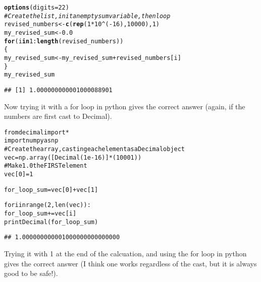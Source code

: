\documentclass{article}\usepackage[]{graphicx}\usepackage[]{color}
\makeatletter
\newcommand{\hlnum}[1]{\textcolor[rgb]{0.686,0.059,0.569}{#1}}%
\newcommand{\hlcom}[1]{\textcolor[rgb]{0.678,0.584,0.686}{\textit{#1}}}%
\newcommand{\hlopt}[1]{\textcolor[rgb]{0,0,0}{#1}}%
\newcommand{\hlstd}[1]{\textcolor[rgb]{0.345,0.345,0.345}{#1}}%
\newcommand{\hlkwa}[1]{\textcolor[rgb]{0.161,0.373,0.58}{\textbf{#1}}}%
\newcommand{\hlkwb}[1]{\textcolor[rgb]{0.69,0.353,0.396}{#1}}%
\newcommand{\hlkwc}[1]{\textcolor[rgb]{0.333,0.667,0.333}{#1}}%
\newcommand{\hlkwd}[1]{\textcolor[rgb]{0.737,0.353,0.396}{\textbf{#1}}}%
\newenvironment{kframe}{%
 \def\at@end@of@kframe{}%
 \ifinner\ifhmode%
  \def\at@end@of@kframe{\end{minipage}}%
  \begin{minipage}{\columnwidth}%
 \fi\fi%
 \def\FrameCommand##1{\hskip\@totalleftmargin \hskip-\fboxsep
 \colorbox{shadecolor}{##1}\hskip-\fboxsep
     \hskip-\linewidth \hskip-\@totalleftmargin \hskip\columnwidth}%
 \MakeFramed {\advance\hsize-\width
   \@totalleftmargin\z@ \linewidth\hsize
   \@setminipage}}%
 {\par\unskip\endMakeFramed%
 \at@end@of@kframe}
\newenvironment{knitrout}{}{} %
\makeatother
\begin{document}
\begin{knitrout}
\color{fgcolor}\begin{kframe}
\begin{alltt}
\hlkwd{options}\hlstd{(}\hlkwc{digits}\hlstd{=}\hlnum{22}\hlstd{)}
\hlcom{# Create the list, init an empty sum variable, then loop}
\hlstd{revised_numbers} \hlkwb{<-} \hlkwd{c}\hlstd{(}\hlkwd{rep}\hlstd{(}\hlnum{1} \hlopt{*} \hlnum{10}\hlopt{^}\hlstd{(}\hlopt{-}\hlnum{16}\hlstd{),} \hlnum{10000}\hlstd{),} \hlnum{1}\hlstd{)}
\hlstd{my_revised_sum} \hlkwb{<-} \hlnum{0.0}
\hlkwa{for} \hlstd{(i} \hlkwa{in} \hlnum{1}\hlopt{:}\hlkwd{length}\hlstd{(revised_numbers))}
\hlstd{\{}
  \hlstd{my_revised_sum} \hlkwb{<-} \hlstd{my_revised_sum} \hlopt{+} \hlstd{revised_numbers[i]}
\hlstd{\}}
\hlstd{my_revised_sum}
\end{alltt}
\begin{verbatim}
## [1] 1.000000000001000088901
\end{verbatim}
\end{kframe}
\end{knitrout}

Now trying it with a for loop in python gives the correct answer (again, if the numbers are first cast to Decimal).

\begin{knitrout}
\color{fgcolor}\begin{kframe}
\begin{alltt}
from decimal import *
import numpy as np
# Create the array, casting each element as a Decimal object
vec = np.array([Decimal(1e-16)]*(10001))
# Make 1.0 the FIRST element
vec[0] = 1

for_loop_sum = vec[0] + vec[1]

for i in range(2,len(vec)):
    for_loop_sum += vec[i]
print Decimal(for_loop_sum)
\end{alltt}

\begin{verbatim}
## 1.000000000001000000000000000
\end{verbatim}
\end{kframe}
\end{knitrout}

Trying it with 1 at the end of the calcuation, and using the for loop in python gives the correct answer (I think one works regardless of the cast, but it is always good to be safe!).
\end{document}
